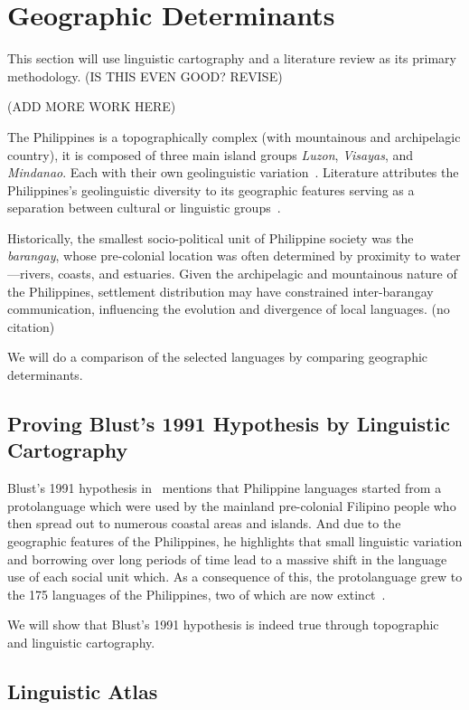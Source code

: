 \section{Geographic Determinants}

This section will use linguistic cartography and a literature review as its
primary methodology. \todo (IS THIS EVEN GOOD? REVISE)

\todo (ADD MORE WORK HERE)

The Philippines is a topographically complex (with mountainous and archipelagic
country), it is composed of three main island groups \emph{Luzon},
\emph{Visayas}, and \emph{Mindanao}. Each with their own geolinguistic
variation~\cite{Boquet_2017}. Literature attributes the Philippines's
geolinguistic diversity to its geographic features serving as a separation
between cultural or linguistic groups~\cite{Blust_1991}.

Historically, the smallest socio-political unit of Philippine society was the
\emph{barangay}, whose pre-colonial location was often determined by proximity
to water---rivers, coasts, and estuaries. Given the archipelagic and
mountainous nature of the Philippines, settlement distribution may have
constrained inter-barangay communication, influencing the evolution and
divergence of local languages. \todo (no citation)

We will do a comparison of the selected languages by comparing geographic determinants.

\subsection{Proving Blust's 1991 Hypothesis by Linguistic Cartography}

Blust's 1991 hypothesis in~\cite{Blust_1991} mentions that Philippine languages started
from a protolanguage which were used by the mainland pre-colonial Filipino people who then
spread out to numerous coastal areas and islands. And due to the geographic features of the
Philippines, he highlights that small linguistic variation and borrowing over long periods
of time lead to a massive shift in the language use of each social unit which.
As a consequence of this, the protolanguage grew to the 175 languages of the Philippines, two
of which are now extinct~\cite{ethnologue2025}.

We will show that Blust's 1991 hypothesis is indeed true through topographic and linguistic cartography.

\subsection{Linguistic Atlas}

